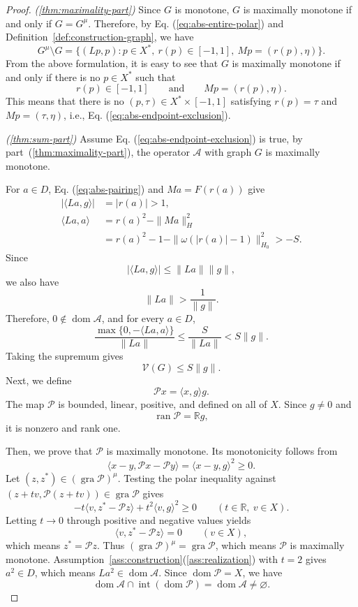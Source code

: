 \documentclass[11pt]{article}
\newcommand{\R}{\mathbb R}
\newcommand{\gra}{\operatorname{gra}}
\newcommand{\dom}{\operatorname{dom}}
\newcommand{\pair}[2]{\langle #1,#2\rangle}
\theoremstyle{definition}
\theoremstyle{remark}
\begin{document}
\begin{proof}
\noindent\textit{\textup{(\ref{thm:maximality-part})}}
Since $G$ is monotone, $G$ is maximally monotone if and only if $G=G^\mu$. Therefore, by Eq. (\ref{eq:abs-entire-polar}) and Definition~\ref{def:construction-graph}, we have 
\[
G^\mu\setminus G
=
\{(Lp,p):p\in X^*,\ r(p)\in[-1,1],\ Mp=(r(p),\eta)\}.
\]
From the above formulation, it is easy to see that $G$ is maximally monotone if and only if there is no $p\in X^*$ such that
\[
r(p)\in[-1,1]
\qquad\text{and}\qquad
Mp=(r(p),\eta).
\]
This means that there is no $(p,\tau)\in X^*\times[-1,1]$ satisfying 
$r(p)=\tau$ and $Mp=(\tau,\eta)$, i.e.,  Eq. (\ref{eq:abs-endpoint-exclusion}).






\noindent\textit{\textup{(\ref{thm:sum-part})}}
Assume Eq. (\ref{eq:abs-endpoint-exclusion}) is true, by
part~\textup{(\ref{thm:maximality-part})}, the operator $\mathcal A$
with graph $G$ is maximally monotone.

For $a\in D$, Eq. (\ref{eq:abs-pairing}) and $Ma=F(r(a))$ give
\[
\begin{aligned}
|\pair{La}{g}|&=|r(a)|>1,\\
\pair{La}{a}
&=r(a)^2-\|Ma\|_H^2\\
&=r(a)^2-1-\|\omega(|r(a)|-1)\|_{H_0}^2>-S.
\end{aligned}
\]
Since
\[
|\pair{La}{g}|\le \|La\|\|g\|,
\]
we also have
\[
\|La\|>\frac{1}{\|g\|}.
\]
Therefore, $0\notin\dom\mathcal A$, and for every $a\in D$,
\[
\frac{\max\{0,-\pair{La}{a}\}}{\|La\|}
\le
\frac{S}{\|La\|}
<
S\|g\|.
\]
Taking the supremum gives
\[
\mathcal V(G)\le S\|g\|.
\]
Next, we define
\[
\mathcal Px=\pair{x}{g}g.
\]
The map $\mathcal P$ is bounded, linear, positive, and defined on all
of $X$. Since $g\ne0$ and
\[
\operatorname{ran}\mathcal P=\R g,
\]
it is nonzero and rank one.

Then, we prove that $\mathcal P$ is maximally monotone. Its monotonicity
follows from
\[
\pair{x-y}{\mathcal Px-\mathcal Py}
=
\pair{x-y}{g}^2\ge0.
\]
Let $(z,z^*)\in(\gra\mathcal P)^\mu$. Testing the polar inequality
against $(z+tv,\mathcal P(z+tv))\in\gra\mathcal P$ gives
\[
-t\pair{v}{z^*-\mathcal Pz}
+t^2\pair{v}{g}^2\ge0
\qquad(t\in\R,\ v\in X).
\]
Letting $t\to0$ through positive and negative values yields
\[
\pair{v}{z^*-\mathcal Pz}=0
\qquad(v\in X),
\]
which means $z^*=\mathcal Pz$. 
Thus $(\gra\mathcal P)^\mu=\gra\mathcal P$, which means $\mathcal P$ is maximally
monotone. 
Assumption~\ref{ass:construction}\textup{(\ref{ass:realization})}
with $t=2$ gives $a^2\in D$, which means 
$La^2\in\dom\mathcal A$. Since $\dom\mathcal P=X$, we have 
\[
\dom\mathcal A\cap\operatorname{int}(\dom\mathcal P)
=
\dom\mathcal A\ne\varnothing.
\]


\end{proof}
\end{document}
